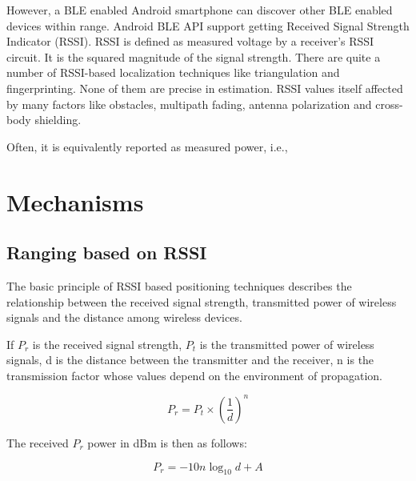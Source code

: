 \documentclass[conference,a4paper]{../../sty/IEEEtran}
\begin{document}
However, a BLE enabled Android smartphone can discover other BLE enabled devices within range. Android BLE API support getting Received Signal Strength Indicator (RSSI). RSSI is defined as measured voltage by a receiver’s RSSI circuit. It is the squared magnitude of the signal strength. There are quite a number of RSSI-based localization techniques like triangulation and fingerprinting. None of them are precise in estimation. RSSI values itself affected by many factors like obstacles, multipath fading, antenna polarization and cross-body shielding.


 Often, it is equivalently 
reported as measured power, i.e., 
\section{Mechanisms}

\subsection{Ranging based on RSSI}


 

The basic principle of RSSI based positioning techniques describes the relationship between the received signal strength, transmitted power of wireless signals and the distance among wireless devices.

If $P_{r}$ is the received signal strength, $P_{t}$ is the transmitted power of wireless 
signals, d is the distance between the transmitter and the receiver, n is the transmission factor whose values depend on the environment of propagation. \cite{xu2010distance}

\begin{equation}
  P_{r} = P_{t} \times (\frac{1}{d})^{n}
 \label{eq1}
\end{equation}

The received $P_{r}$ power in dBm is then as follows:

\begin{equation}
  P_{r} =-10n \log_{10}d + A
 \label{eq2}
\end{equation}
\end{document}
